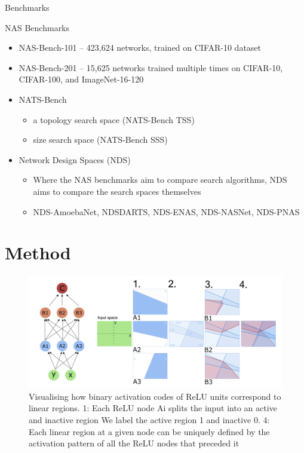 \documentclass{beamer}
\begin{document}
\begin{frame}{Benchmarks}
    \begin{block}{NAS Benchmarks}
        \begin{itemize}
            \item NAS-Bench-101 -- 423,624 networks, trained on CIFAR-10 dataset %
            \item NAS-Bench-201 --  15,625 networks trained multiple times on CIFAR-10, CIFAR-100, and ImageNet-16-120
            \item NATS-Bench \begin{itemize}
                \item a topology search space (NATS-Bench TSS)
                \item size search space (NATS-Bench SSS)
            \end{itemize}
            \item Network Design Spaces (NDS) \begin{itemize}
                \item Where the NAS benchmarks aim to compare search algorithms, NDS aims to compare the search spaces themselves
                \item NDS-AmoebaNet, NDSDARTS, NDS-ENAS, NDS-NASNet, NDS-PNAS
            \end{itemize}
        \end{itemize}
    \end{block}
\end{frame}

\section{Method}
\begin{frame}
    \begin{figure}{}
        \centering
        \includegraphics[scale=0.32]{images/figure2.png}
        \caption{Visualising how binary activation codes of ReLU units correspond to linear regions. 1: Each ReLU node Ai splits the input into an active and inactive region We label the active region 1 and inactive 0.
        4: Each linear region at a given node can be uniquely defined by the activation pattern of all the ReLU nodes that preceded it}
        \label{fig:enter-label}
    \end{figure}
\end{frame}
\end{document}
